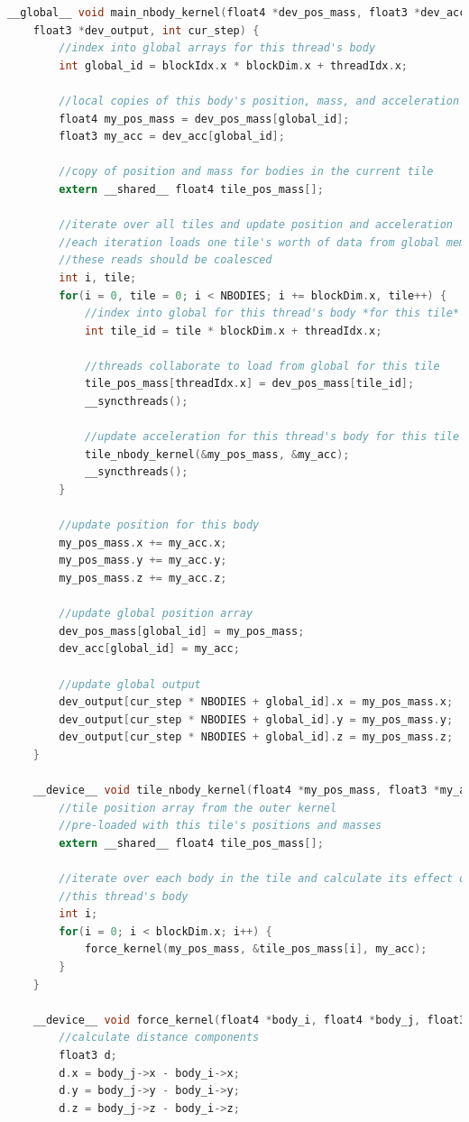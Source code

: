 \documentclass[11pt,a4paper]{article}
\begin{document}
\begin{lstlisting}[language=c]
	__global__ void main_nbody_kernel(float4 *dev_pos_mass, float3 *dev_acc,
	float3 *dev_output, int cur_step) {
		//index into global arrays for this thread's body
		int global_id = blockIdx.x * blockDim.x + threadIdx.x;
		
		//local copies of this body's position, mass, and acceleration
		float4 my_pos_mass = dev_pos_mass[global_id];
		float3 my_acc = dev_acc[global_id];
		
		//copy of position and mass for bodies in the current tile
		extern __shared__ float4 tile_pos_mass[]; 
		
		//iterate over all tiles and update position and acceleration
		//each iteration loads one tile's worth of data from global memory
		//these reads should be coalesced
		int i, tile;
		for(i = 0, tile = 0; i < NBODIES; i += blockDim.x, tile++) {
			//index into global for this thread's body *for this tile*
			int tile_id = tile * blockDim.x + threadIdx.x;
			
			//threads collaborate to load from global for this tile
			tile_pos_mass[threadIdx.x] = dev_pos_mass[tile_id];
			__syncthreads();
			
			//update acceleration for this thread's body for this tile
			tile_nbody_kernel(&my_pos_mass, &my_acc);
			__syncthreads();
		}
		
		//update position for this body
		my_pos_mass.x += my_acc.x;
		my_pos_mass.y += my_acc.y;
		my_pos_mass.z += my_acc.z;
		
		//update global position array
		dev_pos_mass[global_id] = my_pos_mass;
		dev_acc[global_id] = my_acc;
		
		//update global output
		dev_output[cur_step * NBODIES + global_id].x = my_pos_mass.x;
		dev_output[cur_step * NBODIES + global_id].y = my_pos_mass.y;
		dev_output[cur_step * NBODIES + global_id].z = my_pos_mass.z;
	}
	
	__device__ void tile_nbody_kernel(float4 *my_pos_mass, float3 *my_acc) {
		//tile position array from the outer kernel
		//pre-loaded with this tile's positions and masses
		extern __shared__ float4 tile_pos_mass[];
		
		//iterate over each body in the tile and calculate its effect on
		//this thread's body
		int i;
		for(i = 0; i < blockDim.x; i++) {
			force_kernel(my_pos_mass, &tile_pos_mass[i], my_acc);
		}
	}
	
	__device__ void force_kernel(float4 *body_i, float4 *body_j, float3 *acc_i) {
		//calculate distance components
		float3 d;
		d.x = body_j->x - body_i->x;
		d.y = body_j->y - body_i->y;
		d.z = body_j->z - body_i->z;
		

\end{lstlisting}
\end{document}
